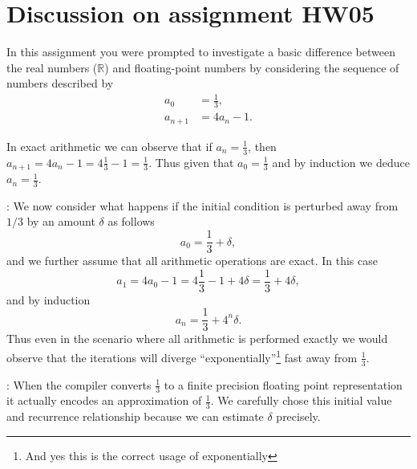 \section{Discussion on assignment HW05}

In this assignment you were prompted to investigate a basic difference between the real numbers ($\mathbb R$) and floating-point numbers by considering the sequence of numbers described by
    \begin{align}
        a_0&=\frac13,\\
        a_{n+1}&=4a_n-1. \label{recur.eqn}
    \end{align}
    
In exact arithmetic we can observe that if $a_n=\frac13$, then $a_{n+1}=4a_n-1=4\frac13-1 = \frac13$. Thus given that $a_0=\frac13$ and by induction we deduce $a_n=\frac13$.

\vspace{8pt}: We now consider what happens if the initial condition is perturbed away from $1/3$ by an amount $\delta$ as follows
\[
a_0 = \frac13 + \delta,  
\]
and we further assume that all arithmetic operations are exact. In this case
\[
a_1 = 4a_0 - 1 = 4\frac13-1 + 4\delta = \frac13 + 4\delta,
\]
and by induction
\[
a_n = \frac13 + 4^n\delta.
\]
Thus even in the scenario where all arithmetic is performed exactly we would observe that the iterations will diverge ``exponentially''\footnote{And yes this is the correct usage of exponentially} fast away from $\frac13$.

\vspace{8pt}: When the compiler converts $\frac13$ to a finite precision floating point representation it actually encodes an approximation of $\frac13$. We carefully chose this initial value and recurrence relationship because we can estimate $\delta$ precisely.

